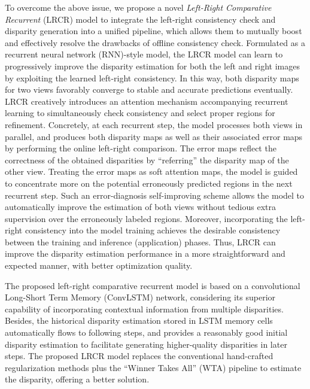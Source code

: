 \documentclass[10pt,twocolumn,letterpaper]{article}
\begin{document}
To overcome the above issue, we propose a novel \textit{Left-Right Comparative Recurrent} (LRCR) model to integrate the left-right consistency check and disparity generation into a unified pipeline, which allows them to mutually boost and effectively resolve the drawbacks of   offline  consistency check. Formulated as a recurrent neural network (RNN)-style model, the LRCR model can learn to progressively improve the disparity estimation for both the left and right images by exploiting  the learned left-right consistency. In this way, both  disparity maps for two views favorably converge to stable and accurate predictions eventually. LRCR creatively introduces an  attention mechanism accompanying recurrent learning to  simultaneously check consistency  and select proper regions for refinement. Concretely,  at each recurrent step, the model processes both views in parallel, and produces both disparity maps as well as their associated error maps by performing the online left-right comparison. The error maps reflect the correctness of the obtained disparities by ``referring'' the disparity map of the other view. Treating the error maps as  soft attention maps, the model is guided to concentrate more on the potential erroneously predicted regions in the next recurrent step. Such an error-diagnosis self-improving scheme allows the model to automatically improve the estimation of both views without tedious extra supervision over  the erroneously labeled regions. Moreover, incorporating the left-right consistency into the model training achieves the desirable consistency between the training and inference (application) phases. Thus, LRCR can improve the disparity estimation performance in a more straightforward and expected manner, with better optimization quality.


The proposed left-right comparative recurrent model is based on a convolutional Long-Short Term Memory (ConvLSTM) network, considering its superior capability of  incorporating contextual information from multiple disparities. Besides, the historical disparity estimation stored in LSTM memory cells   automatically flows to following steps, and provides a reasonably good initial disparity estimation to facilitate  generating  higher-quality disparities in later steps. The proposed LRCR model replaces the conventional hand-crafted regularization methods \cite{scharstein2002taxonomy} plus the ``Winner Takes All'' (WTA) pipeline to estimate the disparity, offering a better solution.
\end{document}
